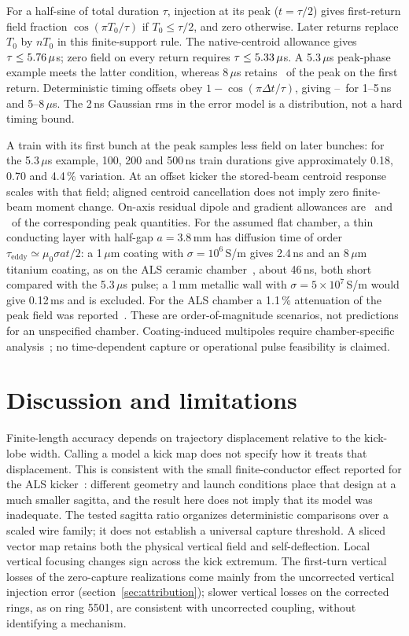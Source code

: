 \documentclass[aps,prab,reprint,amsmath,amssymb,floatfix,longbibliography]{revtex4-2}
\begin{document}
For a half-sine of total duration $\tau$, injection at its peak ($t=\tau/2$) gives first-return field fraction $\cos(\pi T_0/\tau)$ if $T_0\leq\tau/2$, and zero otherwise. Later returns replace $T_0$ by $nT_0$ in this finite-support rule. The native-centroid allowance gives $\tau\leq5.76\,\mu$s; zero field on every return requires $\tau\leq5.33\,\mu$s. A 5.3\,$\mu$s peak-phase example meets the latter condition, whereas 8\,$\mu$s retains \EightUsResidual\ of the peak on the first return. Deterministic timing offsets obey $1-\cos(\pi\Delta t/\tau)$, giving \TimingLossMin--\TimingLossMax\ for 1--5\,ns and 5--8\,$\mu$s. The 2\,ns Gaussian rms in the error model is a distribution, not a hard timing bound.

A train with its first bunch at the peak samples less field on later bunches: for the 5.3\,$\mu$s example, 100, 200 and 500\,ns train durations give approximately 0.18, 0.70 and 4.4\,\% variation. At an offset kicker the stored-beam centroid response scales with that field; aligned centroid cancellation does not imply zero finite-beam moment change. On-axis residual dipole and gradient allowances are \DipoleResidualRel\ and \GradResidualRel\ of the corresponding peak quantities. For the assumed flat chamber, a thin conducting layer with half-gap $a=3.8$\,mm has diffusion time of order $\tau_\mathrm{eddy}\simeq\mu_0\sigma a t/2$: a 1\,$\mu$m coating with $\sigma=10^6$\,S/m gives 2.4\,ns and an 8\,$\mu$m titanium coating, as on the ALS ceramic chamber~\cite{Sun2020}, about 46\,ns, both short compared with the 5.3\,$\mu$s pulse; a 1\,mm metallic wall with $\sigma=5\times10^7$\,S/m would give 0.12\,ms and is excluded. For the ALS chamber a 1.1\,\% attenuation of the peak field was reported~\cite{Sun2020}. These are order-of-magnitude scenarios, not predictions for an unspecified chamber. Coating-induced multipoles require chamber-specific analysis~\cite{Kallestrup2019}; no time-dependent capture or operational pulse feasibility is claimed.

\section{Discussion and limitations}
\label{sec:discussion}

Finite-length accuracy depends on trajectory displacement relative to the kick-lobe width. Calling a model a kick map does not specify how it treats that displacement. This is consistent with the small finite-conductor effect reported for the ALS kicker~\cite{Sun2020}: different geometry and launch conditions place that design at a much smaller sagitta, and the result here does not imply that its model was inadequate. The tested sagitta ratio organizes deterministic comparisons over a scaled wire family; it does not establish a universal capture threshold. A sliced vector map retains both the physical vertical field and self-deflection. Local vertical focusing changes sign across the kick extremum. The first-turn vertical losses of the zero-capture realizations come mainly from the uncorrected vertical injection error (section~\ref{sec:attribution}); slower vertical losses on the corrected rings, as on ring 5501, are consistent with uncorrected coupling, without identifying a mechanism.
\end{document}
